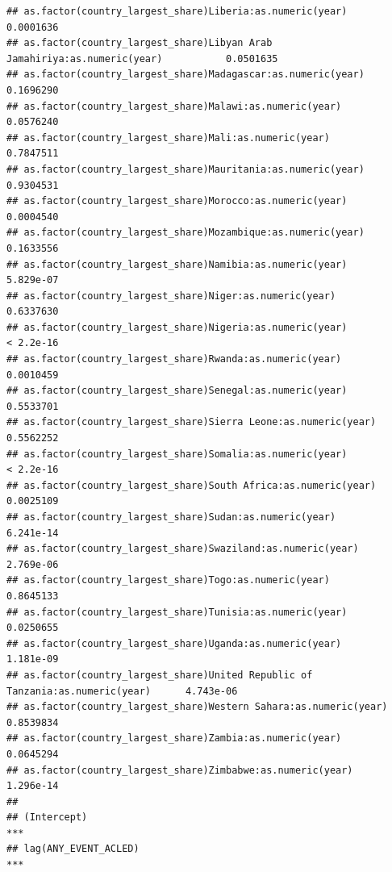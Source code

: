 \documentclass[
  a4paper,
]{article}
\begin{document}
\begin{verbatim}
## as.factor(country_largest_share)Liberia:as.numeric(year)                          0.0001636
## as.factor(country_largest_share)Libyan Arab Jamahiriya:as.numeric(year)           0.0501635
## as.factor(country_largest_share)Madagascar:as.numeric(year)                       0.1696290
## as.factor(country_largest_share)Malawi:as.numeric(year)                           0.0576240
## as.factor(country_largest_share)Mali:as.numeric(year)                             0.7847511
## as.factor(country_largest_share)Mauritania:as.numeric(year)                       0.9304531
## as.factor(country_largest_share)Morocco:as.numeric(year)                          0.0004540
## as.factor(country_largest_share)Mozambique:as.numeric(year)                       0.1633556
## as.factor(country_largest_share)Namibia:as.numeric(year)                          5.829e-07
## as.factor(country_largest_share)Niger:as.numeric(year)                            0.6337630
## as.factor(country_largest_share)Nigeria:as.numeric(year)                          < 2.2e-16
## as.factor(country_largest_share)Rwanda:as.numeric(year)                           0.0010459
## as.factor(country_largest_share)Senegal:as.numeric(year)                          0.5533701
## as.factor(country_largest_share)Sierra Leone:as.numeric(year)                     0.5562252
## as.factor(country_largest_share)Somalia:as.numeric(year)                          < 2.2e-16
## as.factor(country_largest_share)South Africa:as.numeric(year)                     0.0025109
## as.factor(country_largest_share)Sudan:as.numeric(year)                            6.241e-14
## as.factor(country_largest_share)Swaziland:as.numeric(year)                        2.769e-06
## as.factor(country_largest_share)Togo:as.numeric(year)                             0.8645133
## as.factor(country_largest_share)Tunisia:as.numeric(year)                          0.0250655
## as.factor(country_largest_share)Uganda:as.numeric(year)                           1.181e-09
## as.factor(country_largest_share)United Republic of Tanzania:as.numeric(year)      4.743e-06
## as.factor(country_largest_share)Western Sahara:as.numeric(year)                   0.8539834
## as.factor(country_largest_share)Zambia:as.numeric(year)                           0.0645294
## as.factor(country_largest_share)Zimbabwe:as.numeric(year)                         1.296e-14
##                                                                                      
## (Intercept)                                                                       ***
## lag(ANY_EVENT_ACLED)                                                              ***

\end{verbatim}
\end{document}
